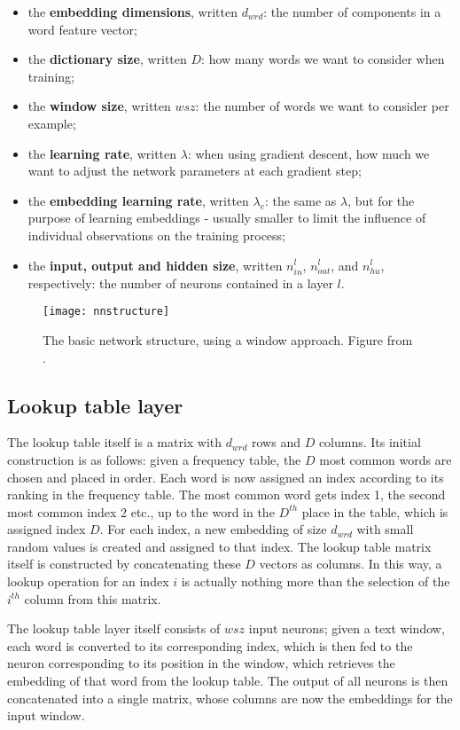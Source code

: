 \begin{itemize}
\item the \textbf{embedding dimensions}, written $d_{wrd}$: the number
of components in a word feature vector;
\item the \textbf{dictionary size}, written $D$: how many words we
want to consider when training;
\item the \textbf{window size}, written $wsz$: the number of words we
want to consider per example;
\item the \textbf{learning rate}, written $\lambda$: when using
gradient descent, how much we want to adjust the network parameters at
each gradient step;
\item the \textbf{embedding learning rate}, written $\lambda_{e}$: the
same as $\lambda$, but for the purpose of learning embeddings -
usually smaller to limit the influence of individual observations on
the training process;
\item the \textbf{input, output and hidden size}, written $n^l_{in}$,
$n^l_{out}$, and $n^l_{hu}$, respectively: the number of neurons
contained in a layer $l$.
\end{itemize}

\begin{figure}
  \texttt{[image: nnstructure]}
  \caption{The basic network structure, using a window
approach. Figure from
\cite[2499]{collobert-2011}.} \label{fig:nnstructure}
\end{figure}

\subsection{Lookup table layer} The lookup table itself is a matrix
with $d_{wrd}$ rows and $D$ columns. Its initial construction is as
follows: given a frequency table, the $D$ most common words are chosen
and placed in order. Each word is now assigned an index according to
its ranking in the frequency table. The most common word gets index 1,
the second most common index 2 etc., up to the word in the $D^{th}$
place in the table, which is assigned index $D$. For each index, a new
embedding of size $d_{wrd}$ with small random values is created and
assigned to that index. The lookup table matrix itself is constructed
by concatenating these $D$ vectors as columns.  In this way, a lookup
operation for an index $i$ is actually nothing more than the selection
of the $i^{th}$ column from this matrix.

The lookup table layer itself consists of $wsz$ input neurons; given a
text window, each word is converted to its corresponding index, which
is then fed to the neuron corresponding to its position in the window,
which retrieves the embedding of that word from the lookup table. The
output of all neurons is then concatenated into a single matrix, whose
columns are now the embeddings for the input window.


